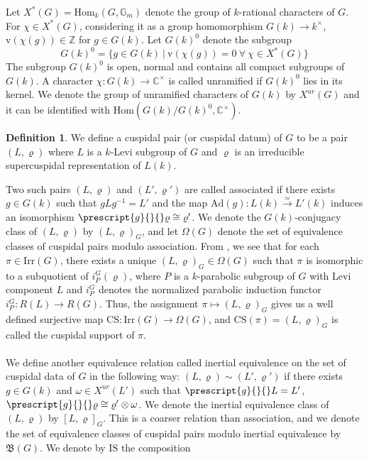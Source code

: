 \documentclass[11 pt]{article}
\numberwithin{equation}{subsection}
\theoremstyle{definition}
\newtheorem{definition}[theorem]{Definition}
\theoremstyle{remark}
\theoremstyle{conjecture}
\newcommand{\rv}{\mathrm{v}}
\newcommand{\Irr}{\mathrm{Irr}}
\newcommand{\Ad}{\mathrm{Ad}}
\newcommand{\Hom}{\mathrm{Hom}}
\newcommand{\IS}{\mathrm{IS}}
\newcommand{\CS}{\mathrm{CS}}
\newcommand{\Z}{\mathbb Z}
\newcommand{\C}{\mathbb C}
\newcommand{\G}{\mathbb G}
\newcommand{\mf}{\mathfrak}
\begin{document}
Let $X^*(G)= \mathrm{Hom}_k(G,\G_m)$ denote the group of $k$-rational characters of $G$. For $\chi \in X^*(G)$, considering it as a group homomorphism $G(k) \rightarrow k^\times$, $\rv(\chi(g))\in \Z$ for $g \in G(k)$. Let $G(k)^0$ denote the subgroup 
\begin{equation*}
     G(k)^0= \{ g \in G(k)\:|\: \rv(\chi(g))=0 \:\forall \: \chi \in X^*(G)\}
\end{equation*}
The subgroup $ G(k)^0$ is open, normal and contains all compact subgroups of $G(k)$. A character $\chi :G(k) \rightarrow \C^\times$ is called unramified if $G(k)^0$ lies in its kernel. We denote the group of unramified characters of $G(k)$ by $X^{ur}(G)$ and it can be identified with $\Hom(G(k)/G(k)^0, \C^\times)$. 
\begin{definition}
    We define a cuspidal pair (or cuspidal datum) of $G$ to be a pair $(L, \varrho)$ where $L$ is a $k$-Levi subgroup of $G$ and $\varrho $ is an irreducible supercuspidal representation of $L(k)$. 
\end{definition}
Two such pairs $(L, \varrho)$ and $(L',\varrho')$ are called associated if there exists $g\in G(k)$ such that $gLg^{-1}=L'$ and the map $\Ad(g) : L(k) \xrightarrow{\simeq} L'(k)$ induces an isomorphism $\prescript{g}{}{}\varrho \cong \varrho'$. We denote the $G(k)$-conjugacy class of $(L,\varrho)$ by $(L,\varrho)_G$, and let $\Omega(G)$ denote the set of equivalence classes of cuspidal pairs modulo association. From \cite[Proposition 1.7.2.1]{roche2009bernstein}, we see that for each $\pi \in \Irr(G)$, there exists a unique $(L,\varrho)_G\in \Omega(G)$ such that $\pi$ is isomorphic to a subquotient of $i^G_P(\varrho)$, where $P$ is a $k$-parabolic subgroup of $G$ with Levi component $L$ and $i^G_P$ denotes the normalized parabolic induction functor $i^G_P: R(L) \rightarrow R(G)$. Thus, the assignment $\pi \mapsto (L,\varrho)_G$ gives us a well defined surjective map $\CS: \Irr(G) \rightarrow \Omega(G)$, and $\CS(\pi)= (L,\varrho)_G$ is called the cuspidal support of $\pi$. \paragraph{}
We define another equivalence relation called inertial equivalence on the set of cuspidal data of $G$ in the following way: $(L,\varrho) \sim (L',\varrho')$ if there exists $g\in G(k)$ and $\omega \in X^{ur}(L') $ such that $\prescript{g}{}{}L=L'$, $\prescript{g}{}{}\varrho \cong \varrho' \otimes \omega$. We denote the inertial equivalence class of $(L,\varrho)$ by $ [L,\varrho]_G$. This is a coarser relation than association, and we denote the set of equivalence classes of cuspidal pairs modulo inertial equivalence by $\mf B(G)$. We denote by $\IS$ the composition 
\end{document}

